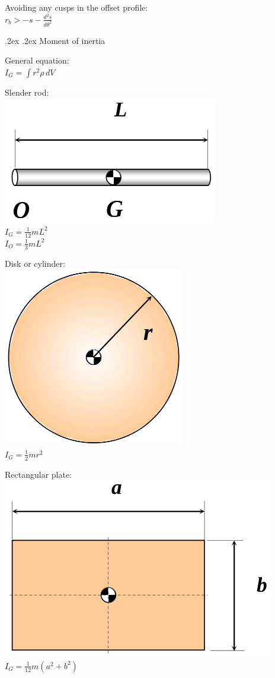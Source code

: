 \documentclass[10pt,landscape,a4paper]{article}
\makeatletter
\renewcommand{\section}{\@startsection{section}{1}{0mm}%
  {.2ex}%
  {.2ex}%
  {\color{myblue}\sffamily\small\bfseries}}
\makeatother
\begin{document}
\begin{multicols*}{5}
  Avoiding any cusps in the offset profile: \\
  \(r_b > - s - \frac{d^2 s}{d \theta^2}\)

  \vspace{10em}

  \section{Moment of inertia}

  General equation: \\
  \(I_G = \int r^2 \rho \, dV\)

  Slender rod: \\
  \includegraphics[width=0.75\linewidth]{moment-of-inertia-slender-rod-diagram} \\
  \(I_G = \frac{1}{12} m L^2\) \\
  \(I_O = \frac{1}{3} m L^2\)

  Disk or cylinder: \\
  \includegraphics[width=0.3\linewidth]{moment-of-inertia-cylinder-or-disk-diagram} \\
  \(I_G = \frac{1}{2} m r^2\)

  Rectangular plate: \\
  \includegraphics[width=0.6\linewidth]{moment-of-inertia-rectangular-plate-diagram} \\
  \(I_G = \frac{1}{12} m (a^2 + b^2)\)


\end{multicols*}
\end{document}
